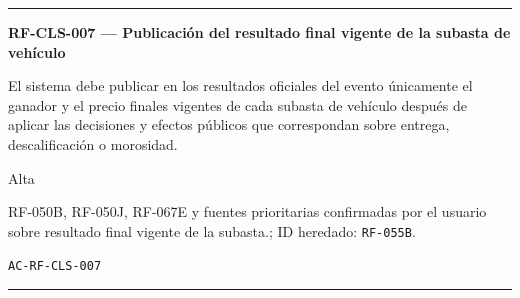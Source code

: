\documentclass[10pt,letterpaper]{article}
\begin{document}
\vspace{0.25em}\hrule\vspace{0.65em}
\noindent\textbf{RF-CLS-007 --- Publicación del resultado final vigente de la subasta de vehículo}\par
\begin{description}[style=nextline,leftmargin=3.15cm,labelwidth=2.8cm,font=\normalfont\bfseries]
\item[Obligación] El sistema debe publicar en los resultados oficiales del evento únicamente el ganador y el precio finales vigentes de cada subasta de vehículo después de aplicar las decisiones y efectos públicos que correspondan sobre entrega, descalificación o morosidad.
\item[Prioridad] Alta
\item[Procedencia] RF-050B, RF-050J, RF-067E y fuentes prioritarias confirmadas por el usuario sobre resultado final vigente de la subasta.; ID heredado: \texttt{RF-055B}.
\item[Verificación] \texttt{AC-RF-CLS-007}
\end{description}
\vspace{0.25em}\hrule\vspace{0.65em}
\end{document}
